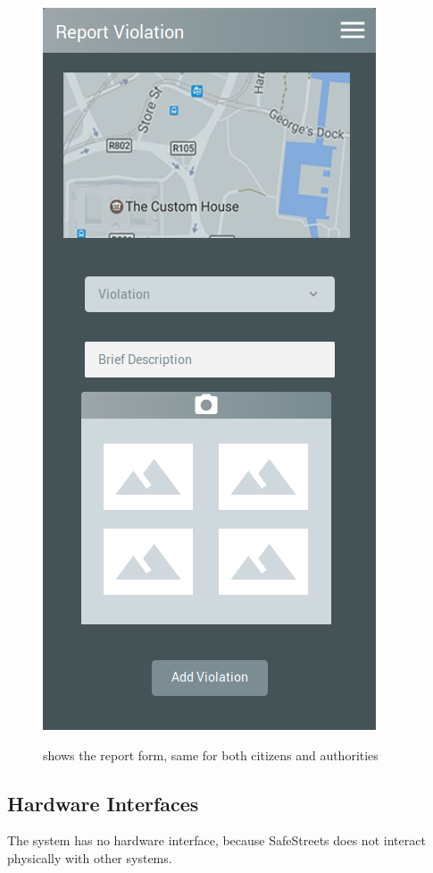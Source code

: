 \documentclass[../RASD.tex]{subfiles}
\begin{document}
            \begin{figure}[H]
                \centering
                \includegraphics[scale = 0.4]{assets/report.png}\\[1.6 cm]
                \caption[Report a violation \textit{Mockup}]{shows the report form, same for both citizens and authorities}
            \end{figure}
            \subsection{Hardware Interfaces}\label{subsec:hardware-interfaces}
        The system has no hardware interface, because SafeStreets does not interact physically with other systems.
\end{document}

